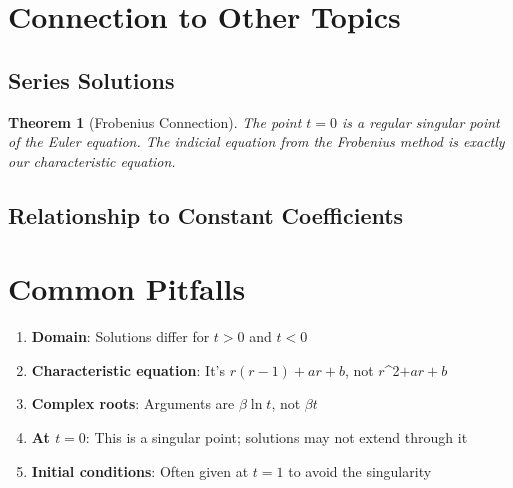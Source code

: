 \documentclass[12pt]{article}
\newtheorem{theorem}{Theorem}
\begin{document}
\section{Connection to Other Topics}

\subsection{Series Solutions}

\begin{theorem}[Frobenius Connection]
The point $t = 0$ is a regular singular point of the Euler equation. The indicial equation from the Frobenius method is exactly our characteristic equation.
\end{theorem}

\subsection{Relationship to Constant Coefficients}

\begin{keypoint}
\begin{center}
\end{center}
\end{keypoint}

\section{Common Pitfalls}

\begin{warning}
\begin{enumerate}
    \item \textbf{Domain}: Solutions differ for $t > 0$ and $t < 0$
    \item \textbf{Characteristic equation}: It's $r(r-1) + ar + b$, not $r$^{2}$ + ar + b$
    \item \textbf{Complex roots}: Arguments are $\beta\ln t$, not $\beta t$
    \item \textbf{At $t = 0$}: This is a singular point; solutions may not extend through it
    \item \textbf{Initial conditions}: Often given at $t = 1$ to avoid the singularity
\end{enumerate}
\end{warning}
\end{document}
